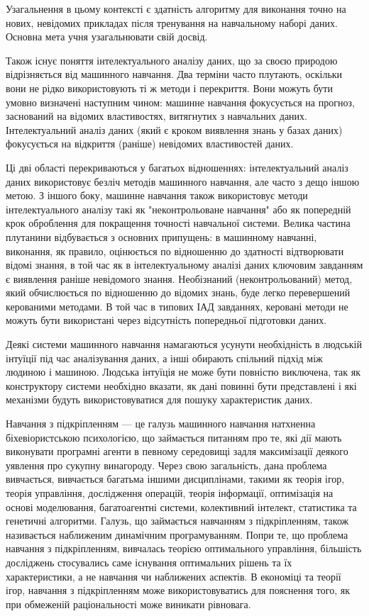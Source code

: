 Узагальнення в цьому контексті є здатність алгоритму для виконання точно на нових, невідомих прикладах після тренування на навчальному наборі даних. Основна мета учня узагальнювати свій досвід.

Також існує поняття інтелектуального аналізу даних, що за своєю природою відрізняється від машинного навчання. Два терміни часто плутають, оскільки вони не рідко використовують ті ж методи і перекриття. Вони можуть бути умовно визначені наступним чином: машинне навчання фокусується на прогноз, заснований на відомих властивостях, витягнутих з навчальних даних. Інтелектуальний аналіз даних (який є кроком виявлення знань у базах даних) фокусується на відкриття (раніше) невідомих властивостей даних.

Ці дві області перекриваються у багатьох відношеннях: інтелектуальний аналіз даних використовує безліч методів машинного навчання, але часто з дещо іншою метою. З іншого боку, машинне навчання також використовує методи інтелектуального аналізу такі як "неконтрольоване навчання" або як попередній крок оброблення для покращення точності навчальної системи. Велика частина плутанини відбувається з основних припущень: в машинному навчанні, виконання, як правило, оцінюється по відношенню до здатності відтворювати відомі знання, в той час як в інтелектуальному аналізі даних ключовим завданням є виявлення раніше невідомого знання. Необізнаний (неконтрольований) метод, який обчислюється по відношенню до відомих знань, буде легко перевершений керованими методами. В той час в типових ІАД завданнях, керовані методи не можуть бути використані через відсутність попередньої підготовки даних.

Деякі системи машинного навчання намагаються усунути необхідність в людській інтуїції під час аналізування даних, а інші обирають спільний підхід між людиною і машиною. Людська інтуїція не може бути повністю виключена, так як конструктору системи необхідно вказати, як дані повинні бути представлені і які механізми будуть використовуватися для пошуку характеристик даних.

Навчання з підкріпленням — це галузь машинного навчання натхненна біхевіористською психологією, що займається питанням про те, які дії мають виконувати програмні агенти в певному середовищі задля максимізації деякого уявлення про сукупну винагороду. Через свою загальність, дана проблема вивчається, вивчається багатьма іншими дисциплінами, такими як теорія ігор, теорія управління, дослідження операцій, теорія інформації, оптимізація на основі моделювання, багатоагентні системи, колективний інтелект, статистика та генетичні алгоритми. Галузь, що займається навчанням з підкріпленням, також називається наближеним динамічним програмуванням. Попри те, що проблема навчання з підкріпленням, вивчалась теорією оптимального управління, більшість досліджень стосувались саме існування оптимальних рішень та їх характеристики, а не навчання чи наближених аспектів. В економіці та теорії ігор, навчання з підкріпленням може використовуватись для пояснення того, як при обмеженій раціональності може виникати рівновага.

